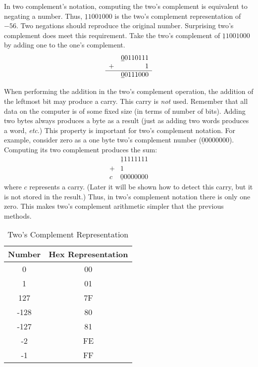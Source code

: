In two complement's notation, computing the two's complement is equivalent
to negating a number. Thus, $\underline{1}1001000$ is the two's complement
representation of $-56$. Two negations should reproduce the original number.
Surprising two's complement does meet this requirement. Take the two's
complement of $\underline{1}1001000$ by adding one to the one's complement.
\[
\begin{array}{rr}
 & \underline{0}0110111 \\
+&                    1 \\ \hline
 & \underline{0}0111000
\end{array}
\]

When performing the addition in the two's complement operation, the addition
of the leftmost bit may produce a carry. This carry is \emph{not} used. 
Remember that all data on the computer is of some fixed size (in terms of
number of bits). Adding two bytes always produces a byte as a result (just
as adding two words produces a word, {\em etc\/}.) This property is important 
for two's complement notation. For example, consider zero as a one byte
two's complement number ($\underline{0}0000000$). Computing its two complement
produces the sum:
\[
\begin{array}{rr}
 & \underline{1}1111111 \\
+&                    1 \\ \hline
c& \underline{0}0000000
\end{array}
\]
where $c$ represents a carry. (Later it will be shown how to detect this carry,
but it is not stored in the result.) Thus, in two's complement notation there
is only one zero. This makes two's complement arithmetic simpler that the
previous methods.

\begin{table}
\centering
\begin{tabular}{||c|c||}
\hline
Number & Hex Representation \\
\hline
0 & 00 \\
1 & 01 \\
127 & 7F \\
-128 & 80 \\
-127 & 81 \\
-2 & FE \\
-1 & FF \\
\hline
\end{tabular}
\caption{Two's Complement Representation \label{tab:twocomp}}
\end{table}


